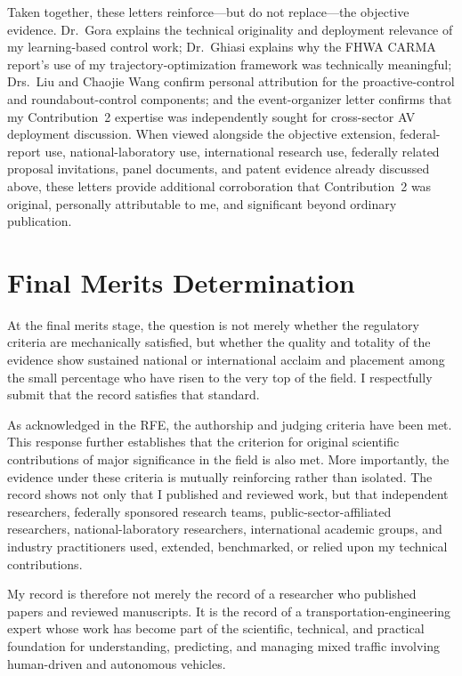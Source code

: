 \documentclass[11pt,letterpaper]{article}
\begin{document}
Taken together, these letters reinforce---but do not replace---the objective evidence. Dr.~Gora explains the technical originality and deployment relevance of my learning-based control work; Dr.~Ghiasi explains why the FHWA CARMA report's use of my trajectory-optimization framework was technically meaningful; Drs.~Liu and Chaojie Wang confirm personal attribution for the proactive-control and roundabout-control components; and the event-organizer letter confirms that my Contribution~2 expertise was independently sought for cross-sector AV deployment discussion. When viewed alongside the objective extension, federal-report use, national-laboratory use, international research use, federally related proposal invitations, panel documents, and patent evidence already discussed above, these letters provide additional corroboration that Contribution~2 was original, personally attributable to me, and significant beyond ordinary publication.

\section{Final Merits Determination}

At the final merits stage, the question is not merely whether the regulatory criteria are mechanically satisfied, but whether the quality and totality of the evidence show sustained national or international acclaim and placement among the small percentage who have risen to the very top of the field. I respectfully submit that the record satisfies that standard.

As acknowledged in the RFE, the authorship and judging criteria have been met. This response further establishes that the criterion for original scientific contributions of major significance in the field is also met. More importantly, the evidence under these criteria is mutually reinforcing rather than isolated. The record shows not only that I published and reviewed work, but that independent researchers, federally sponsored research teams, public-sector-affiliated researchers, national-laboratory researchers, international academic groups, and industry practitioners used, extended, benchmarked, or relied upon my technical contributions.

My record is therefore not merely the record of a researcher who published papers and reviewed manuscripts. It is the record of a transportation-engineering expert whose work has become part of the scientific, technical, and practical foundation for understanding, predicting, and managing mixed traffic involving human-driven and autonomous vehicles.
\end{document}
